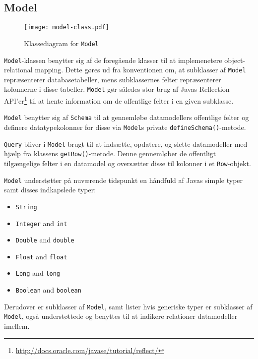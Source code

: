 \clearpage

\subsection{Model}

\begin{wrapfigure}{r}{0.35\textwidth}
  \centering
  \texttt{[image: model-class.pdf]}
  \caption{Klassediagram for \texttt{Model}}
  \label{class-diagram:model}
\end{wrapfigure}

\texttt{Model}-klassen benytter sig af de foregående klasser til at implemenetere object-relational mapping. Dette gøres ud fra konventionen om, at subklasser af \texttt{Model} repræsenterer databasetabeller, mens subklassernes felter repræsenterer kolonnerne i disse tabeller. \texttt{Model} gør således stor brug af Javas Reflection API'er\footnote{\url{http://docs.oracle.com/javase/tutorial/reflect/}} til at hente information om de offentlige felter i en given subklasse.

\texttt{Model} benytter sig af \texttt{Schema} til at gennemløbe datamodellers offentlige felter og definere datatypekolonner for disse via \texttt{Model}s private \texttt{defineSchema()}-metode.

\texttt{Query} bliver i \texttt{Model} brugt til at indsætte, opdatere, og slette datamodeller med hjælp fra klassens \texttt{getRow()}-metode. Denne gennemløber de offentligt tilgængelige felter i en datamodel og oversætter disse til kolonner i et \texttt{Row}-objekt.

\texttt{Model} understøtter på nuværende tidspunkt en håndfuld af Javas simple typer samt disses indkapslede typer:

\begin{multicols}{3}
\begin{itemize}
  \item \texttt{String}
  \item \texttt{Integer} and \texttt{int}
  \item \texttt{Double} and \texttt{double}
  \item \texttt{Float} and \texttt{float}
  \item \texttt{Long} and \texttt{long}
  \item \texttt{Boolean} and \texttt{boolean}
\end{itemize}
\end{multicols}

Derudover er subklasser af \texttt{Model}, samt lister hvis generiske typer er subklasser af \texttt{Model}, også understøttede og benyttes til at indikere relationer datamodeller imellem.

